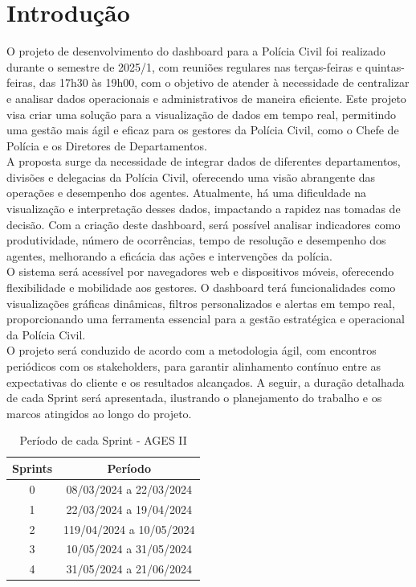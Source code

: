 \section[Introdução]{Introdução}

O projeto de desenvolvimento do dashboard para a Polícia Civil foi realizado durante o semestre de 2025/1, com reuniões regulares nas terças-feiras e quintas-feiras, das 17h30 às 19h00, com o objetivo de atender à necessidade de centralizar e analisar dados operacionais e administrativos de maneira eficiente. Este projeto visa criar uma solução para a visualização de dados em tempo real, permitindo uma gestão mais ágil e eficaz para os gestores da Polícia Civil, como o Chefe de Polícia e os Diretores de Departamentos. \\
A proposta surge da necessidade de integrar dados de diferentes departamentos, divisões e delegacias da Polícia Civil, oferecendo uma visão abrangente das operações e desempenho dos agentes. Atualmente, há uma dificuldade na visualização e interpretação desses dados, impactando a rapidez nas tomadas de decisão. Com a criação deste dashboard, será possível analisar indicadores como produtividade, número de ocorrências, tempo de resolução e desempenho dos agentes, melhorando a eficácia das ações e intervenções da polícia. \\
O sistema será acessível por navegadores web e dispositivos móveis, oferecendo flexibilidade e mobilidade aos gestores. O dashboard terá funcionalidades como visualizações gráficas dinâmicas, filtros personalizados e alertas em tempo real, proporcionando uma ferramenta essencial para a gestão estratégica e operacional da Polícia Civil. \\
O projeto será conduzido de acordo com a metodologia ágil, com encontros periódicos com os stakeholders, para garantir alinhamento contínuo entre as expectativas do cliente e os resultados alcançados. A seguir, a duração detalhada de cada Sprint será apresentada, ilustrando o planejamento do trabalho e os marcos atingidos ao longo do projeto.

\begin{table}[H]
    \centering
    \caption{Período de cada Sprint - AGES II}
    \begin{tabular}{|c|c|}
        \hline
        \textbf{Sprints} & \textbf{Período} \\
        \hline
        0 & 08/03/2024 a 22/03/2024\\
        1 & 22/03/2024 a 19/04/2024 \\
        2 & 119/04/2024 a 10/05/2024 \\
        3 & 10/05/2024 a 31/05/2024 \\
        4 & 31/05/2024 a 21/06/2024 \\
        \hline
    \end{tabular}
\end{table}

